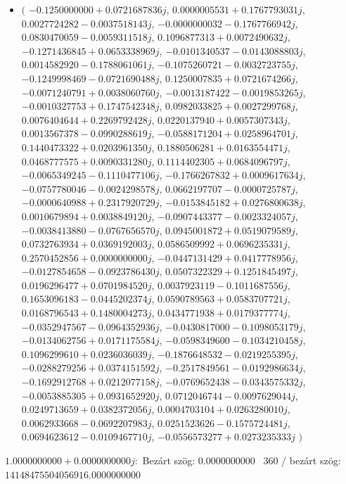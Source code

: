 \documentclass[14pt,a4paper]{article}
\begin{document}
\begin{itemize}
\item
$\big($
$-0.1250000000+0.0721687836j$, $0.0000005531+0.1767793031j$, $0.0027724282-0.0037518143j$, $-0.0000000032-0.1767766942j$, $0.0830470059-0.0059311518j$, $0.1096877313+0.0072490632j$, $-0.1271436845+0.0653338969j$, $-0.0101340537-0.0143088803j$, $0.0014582920-0.1788061061j$, $-0.1075260721-0.0032723755j$, $-0.1249998469-0.0721690488j$, $0.1250007835+0.0721674266j$, $-0.0071240791+0.0038060760j$, $-0.0013187422-0.0019853265j$, $-0.0010327753+0.1747542348j$, $0.0982033825+0.0027299768j$, $0.0076404644+0.2269792428j$, $0.0220137940+0.0057307343j$, $0.0013567378-0.0990288619j$, $-0.0588171204+0.0258964701j$, $0.1440473322+0.0203961350j$, $0.1880506281+0.0163554471j$, $0.0468777575+0.0090331280j$, $0.1114402305+0.0684096797j$, $-0.0065349245-0.1110477106j$, $-0.1766267832+0.0009617634j$, $-0.0757780046-0.0024298578j$, $0.0662197707-0.0000725787j$, $-0.0000640988+0.2317920729j$, $-0.0153845182+0.0276800638j$, $0.0010679894+0.0038849120j$, $-0.0907443377-0.0023324057j$, $-0.0038413880-0.0767656570j$, $0.0945001872+0.0519079589j$, $0.0732763934+0.0369192003j$, $0.0586509992+0.0696235331j$, $0.2570452856+0.0000000000j$, $-0.0447131429+0.0417778956j$, $-0.0127854658-0.0923786430j$, $0.0507322329+0.1251845497j$, $0.0196296477+0.0701984520j$, $0.0037923119-0.1011687556j$, $0.1653096183-0.0445202374j$, $0.0590789563+0.0583707721j$, $0.0168796543+0.1480004273j$, $0.0434771938+0.0179377774j$, $-0.0352947567-0.0964352936j$, $-0.0430817000-0.1098053179j$, $-0.0134062756+0.0171175584j$, $-0.0598349600-0.1034210458j$, $0.1096299610+0.0236036039j$, $-0.1876648532-0.0219255395j$, $-0.0288279256+0.0374151592j$, $-0.2517849561-0.0192986634j$, $-0.1692912768+0.0212077158j$, $-0.0769652438-0.0343575332j$, $-0.0053885305+0.0931652920j$, $0.0712046744-0.0097629044j$, $0.0249713659+0.0382372056j$, $0.0004703104+0.0263280010j$, $0.0062933668-0.0692207983j$, $0.0251523626-0.1575724481j$, $0.0694623612-0.0109467710j$, $-0.0556573277+0.0273235333j$
$\big)$
\end{itemize}
$1.0000000000+0.0000000000j$:\
Bezárt szög: $0.0000000000$ \
360 / bezárt szög: $14148475504056916.0000000000$\
\end{document}

